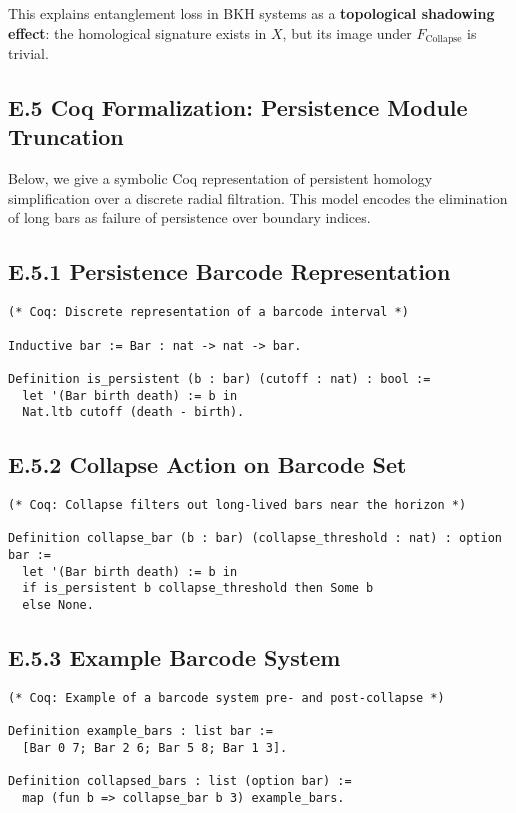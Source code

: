 \documentclass[11pt]{article}
\begin{document}
This explains entanglement loss in BKH systems as a \textbf{topological shadowing effect}: the homological signature exists in \( X \), but its image under \( F_{\mathrm{Collapse}} \) is trivial.

\subsection*{E.5 Coq Formalization: Persistence Module Truncation}

Below, we give a symbolic Coq representation of persistent homology simplification over a discrete radial filtration. This model encodes the elimination of long bars as failure of persistence over boundary indices.

\subsection*{E.5.1 Persistence Barcode Representation}

\begin{lstlisting}
(* Coq: Discrete representation of a barcode interval *)

Inductive bar := Bar : nat -> nat -> bar.

Definition is_persistent (b : bar) (cutoff : nat) : bool :=
  let '(Bar birth death) := b in
  Nat.ltb cutoff (death - birth).
\end{lstlisting}

\subsection*{E.5.2 Collapse Action on Barcode Set}

\begin{lstlisting}
(* Coq: Collapse filters out long-lived bars near the horizon *)

Definition collapse_bar (b : bar) (collapse_threshold : nat) : option bar :=
  let '(Bar birth death) := b in
  if is_persistent b collapse_threshold then Some b
  else None.
\end{lstlisting}

\subsection*{E.5.3 Example Barcode System}

\begin{lstlisting}
(* Coq: Example of a barcode system pre- and post-collapse *)

Definition example_bars : list bar :=
  [Bar 0 7; Bar 2 6; Bar 5 8; Bar 1 3].

Definition collapsed_bars : list (option bar) :=
  map (fun b => collapse_bar b 3) example_bars.
\end{lstlisting}
\end{document}
